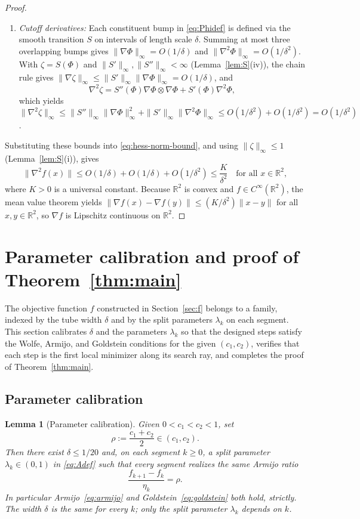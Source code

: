 \documentclass[11pt]{article}
\newtheorem{lemma}[theorem]{Lemma}
\newcommand{\R}{\mathbb{R}}
\begin{document}
\begin{proof}
\begin{enumerate}
\item \emph{Cutoff derivatives:}
Each constituent bump in \eqref{eq:Phidef} is defined via the smooth transition $S$ on intervals of length scale $\delta$.
Summing at most three overlapping bumps gives $\|\nabla\Phi\|_\infty = O(1/\delta)$ and $\|\nabla^2\Phi\|_\infty = O(1/\delta^2)$.
With $\zeta = S(\Phi)$ and $\|S'\|_\infty, \|S''\|_\infty < \infty$ (Lemma~\ref{lem:S}(iv)), the chain rule gives $\|\nabla\zeta\|_\infty \le \|S'\|_\infty \|\nabla\Phi\|_\infty = O(1/\delta)$, and
\[
\nabla^2\zeta = S''(\Phi)\nabla\Phi\otimes\nabla\Phi + S'(\Phi)\nabla^2\Phi,
\]
which yields $\|\nabla^2\zeta\|_\infty \le \|S''\|_\infty \|\nabla\Phi\|_\infty^2 + \|S'\|_\infty \|\nabla^2\Phi\|_\infty \le O(1/\delta^2) + O(1/\delta^2) = O(1/\delta^2)$.
\end{enumerate}
Substituting these bounds into \eqref{eq:hess-norm-bound}, and using $\|\zeta\|_\infty \le 1$ (Lemma~\ref{lem:S}(i)), gives
\[
\|\nabla^2 f(x)\| \le O(1/\delta) + O(1/\delta) + O(1/\delta^2) \le \frac{K}{\delta^2} \quad \text{for all } x \in \R^2,
\]
where $K > 0$ is a universal constant.
Because $\R^2$ is convex and $f \in C^\infty(\R^2)$, the mean value theorem yields
$\|\nabla f(x) - \nabla f(y)\| \le (K/\delta^2)\|x-y\|$ for all $x, y \in \R^2$,
so $\nabla f$ is Lipschitz continuous on $\R^2$.
\end{proof}

\section{Parameter calibration and proof of Theorem~\ref{thm:main}}
\label{sec:ls}

The objective function $f$ constructed in Section~\ref{sec:f} belongs to a family, indexed by the tube width $\delta$ and by the split parameters $\lambda_k$ on each segment.
This section calibrates $\delta$ and the parameters $\lambda_k$ so that the designed steps satisfy the Wolfe, Armijo, and Goldstein conditions for the given $(c_1,c_2)$, verifies that each step is the first local minimizer along its search ray, and completes the proof of Theorem~\ref{thm:main}.

\subsection{Parameter calibration}
\label{sec:calibration}

\begin{lemma}[Parameter calibration]
\label{lem:armijo}
Given $0<c_1<c_2<1$, set
\begin{equation}
\label{eq:rhodef}
\rho:=\frac{c_1+c_2}2\in(c_1,c_2).
\end{equation}
Then there exist $\delta\le1/20$ and, on each segment $k\ge0$, a split
parameter $\lambda_k\in(0,1)$ in \eqref{eq:Adef} such that every segment
realizes the same Armijo ratio
\[
\frac{f_{k+1}-f_k}{\eta_k}=\rho .
\]
In particular Armijo~\eqref{eq:armijo} and Goldstein~\eqref{eq:goldstein}
both hold, strictly. The width $\delta$ is the same for every $k$; only
the split parameter $\lambda_k$ depends on $k$.
\end{lemma}
\end{document}
